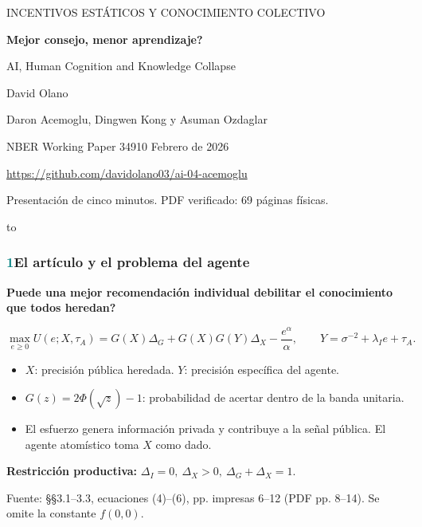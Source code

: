 \documentclass[12pt,aspectratio=169]{beamer}
\newcommand{\sourceLine}[1]{\vfill{\scriptsize\color{Muted}Fuente: #1\par}}
\begin{document}
\begin{frame}[plain]
  \vspace{0.65cm}
  {\color{Teal}\large\MakeUppercase{Incentivos estáticos y conocimiento colectivo}\par}
  \vspace{0.28cm}
  {\fontsize{25}{29}\selectfont\bfseries
    \textquestiondown{}Mejor consejo, menor aprendizaje?\par}
  \vspace{0.14cm}
  {\Large AI, Human Cognition and Knowledge Collapse\par}

  \vspace{0.55cm}
  {\large David Olano\par}
  \vspace{0.10cm}
  {\normalsize Daron Acemoglu, Dingwen Kong y Asuman Ozdaglar\par}
  {\normalsize\color{Muted}NBER Working Paper 34910 \quad Febrero de 2026\par}

  \vspace{0.38cm}
  {\large\url{https://github.com/davidolano03/ai-04-acemoglu}\par}

  \vspace{0.25cm}
  {\small\color{Muted}Presentación de cinco minutos. PDF verificado: 69 páginas físicas.\par}

  \vfill
  \hbox to 
\end{frame}

\begin{frame}
  \frametitle{\textcolor{Teal}{1}\quad El artículo y el problema del agente}

  {\color{Teal}\bfseries
    \textquestiondown{}Puede una mejor recomendación individual debilitar el conocimiento que todos heredan?}

  \vspace{0.18cm}
  \[
  \max_{e\geq 0}
  U(e;X,\tau_A)
  =
  G(X)\Delta_G
  +G(X)G(Y)\Delta_X
  -\frac{e^\alpha}{\alpha},
  \qquad
  Y=\sigma^{-2}+\lambda_I e+\tau_A .
  \]

  \begin{itemize}
    \item \(X\): precisión pública heredada. \(Y\): precisión específica del agente.
    \item \(G(z)=2\Phi(\sqrt z)-1\): probabilidad de acertar dentro de la banda unitaria.
    \item El esfuerzo genera información privada y contribuye a la señal pública. El agente atomístico toma \(X\) como dado.
  \end{itemize}

  \vspace{0.08cm}
  {\bfseries Restricción productiva:}
  \(\Delta_I=0,\ \Delta_X>0,\ \Delta_G+\Delta_X=1\).

  \sourceLine{\S\S3.1--3.3, ecuaciones (4)--(6), pp. impresas 6--12 (PDF pp. 8--14). Se omite la constante \(f(0,0)\).}
\end{frame}
\end{document}
